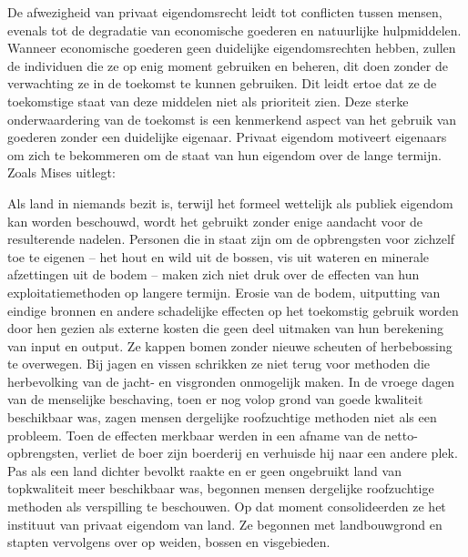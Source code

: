 De afwezigheid van privaat eigendomsrecht leidt tot conflicten tussen mensen, evenals tot de degradatie van economische goederen en natuurlijke hulpmiddelen. Wanneer economische goederen geen duidelijke eigendomsrechten hebben, zullen de individuen die ze op enig moment gebruiken en beheren, dit doen zonder de verwachting ze in de toekomst te kunnen gebruiken. Dit leidt ertoe dat ze de toekomstige staat van deze middelen niet als prioriteit zien. Deze sterke onderwaardering van de toekomst is een kenmerkend aspect van het gebruik van goederen zonder een duidelijke eigenaar. Privaat eigendom motiveert eigenaars om zich te bekommeren om de staat van hun eigendom over de lange termijn. Zoals Mises uitlegt:

\begin{blockquotebox}
    Als land in niemands bezit is, terwijl het formeel wettelijk als publiek eigendom kan worden beschouwd, wordt het gebruikt zonder enige aandacht voor de resulterende nadelen. Personen die in staat zijn om de opbrengsten voor zichzelf toe te eigenen -- het hout en wild uit de bossen, vis uit wateren en minerale afzettingen uit de bodem -- maken zich niet druk over de effecten van hun exploitatiemethoden op langere termijn. Erosie van de bodem, uitputting van eindige bronnen en andere schadelijke effecten op het toekomstig gebruik worden door hen gezien als externe kosten die geen deel uitmaken van hun berekening van input en output. Ze kappen bomen zonder nieuwe scheuten of herbebossing te overwegen. Bij jagen en vissen schrikken ze niet terug voor methoden die herbevolking van de jacht- en visgronden onmogelijk maken. In de vroege dagen van de menselijke beschaving, toen er nog volop grond van goede kwaliteit beschikbaar was, zagen mensen dergelijke roofzuchtige methoden niet als een probleem. Toen de effecten merkbaar werden in een afname van de netto-opbrengsten, verliet de boer zijn boerderij en verhuisde hij naar een andere plek. Pas als een land dichter bevolkt raakte en er geen ongebruikt land van topkwaliteit meer beschikbaar was, begonnen mensen dergelijke roofzuchtige methoden als verspilling te beschouwen. Op dat moment consolideerden ze het instituut van privaat eigendom van land. Ze begonnen met landbouwgrond en stapten vervolgens over op weiden, bossen en visgebieden.\footnotemark
\end{blockquotebox}
